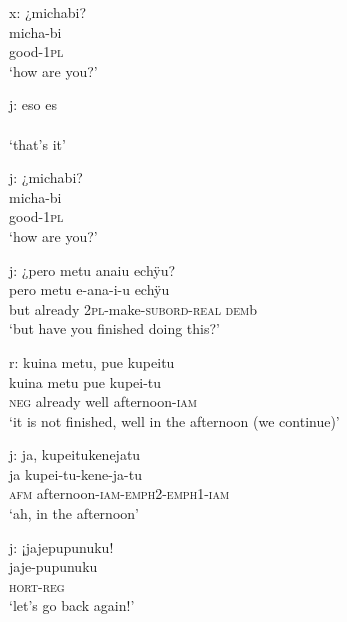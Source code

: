 \ea%
\begingl 
\glpreamble \textup{x:} ¿michabi?\\
\gla micha-bi\\ 
\glb good-1\textsc{pl}\\ 
\glft ‘how are you?’\\ 
\endgl
\xe

\ea%
\begingl 
\gla \textup{j:} eso es\\
\\ 
\glft ‘that’s it’\\ 
\endgl
\xe

\ea%
\begingl 
\glpreamble \textup{j:} ¿michabi?\\
\gla micha-bi\\ 
\glb good-1\textsc{pl}\\ 
\glft ‘how are you?’\\ 
\endgl
\xe


\ea%
\begingl
\glpreamble \textup{j:} ¿pero metu anaiu echÿu?\\
\gla pero metu e-ana-i-u echÿu\\
\glb but already 2\textsc{pl}-make-\textsc{subord}-\textsc{real} \textsc{dem}b\\
\glft ‘but have you finished doing this?’
\endgl
\xe


\ea%
\begingl
\glpreamble \textup{r:} kuina metu, pue kupeitu\\
\gla kuina metu pue kupei-tu\\
\glb \textsc{neg} already well afternoon-\textsc{iam}\\
\glft ‘it is not finished, well in the afternoon (we continue)’
\endgl
\xe


\ea%
\begingl
\glpreamble \textup{j:}  ja, kupeitukenejatu\\
\gla  ja kupei-tu-kene-ja-tu\\
\glb \textsc{afm} afternoon-\textsc{iam}-\textsc{emph}2-\textsc{emph}1-\textsc{iam}\\
\glft ‘ah, in the afternoon’
\endgl
\xe



\ea%
\begingl
\glpreamble \textup{j:} ¡jajepupunuku!\\
\gla jaje-pupunuku\\
\glb \textsc{hort}-\textsc{reg}\\
\glft ‘let’s go back again!’
\endgl
\xe


